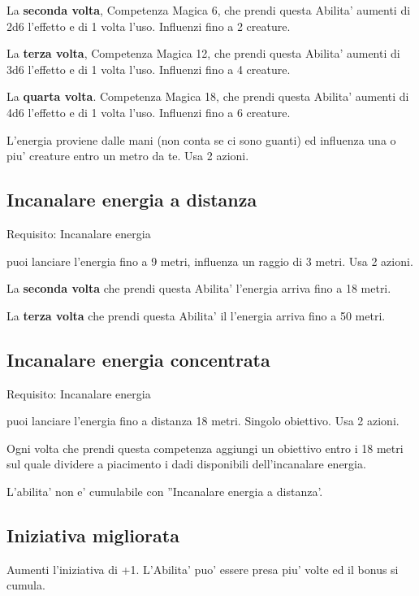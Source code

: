 \documentclass[a4paper,11pt,twoside,openany]{book}
\begin{document}
	La \textbf{seconda volta}, Competenza Magica 6, che prendi questa Abilita' aumenti di 2d6 l'effetto e di 1 volta l'uso. Influenzi fino a 2 creature.
	
	La \textbf{terza volta}, Competenza Magica 12, che prendi questa Abilita' aumenti di 3d6 l'effetto e di 1 volta l'uso. Influenzi fino a 4 creature.
	
	La \textbf{quarta volta}. Competenza Magica 18, che prendi questa Abilita' aumenti di 4d6 l'effetto e di 1 volta l'uso. Influenzi fino a 6 creature.
	
	L'energia proviene dalle mani (non conta se ci sono guanti) ed influenza una o piu' creature entro un metro da te. Usa 2 azioni.
	
	\subsection{Incanalare energia a distanza}
	
	Requisito: Incanalare energia
	
	puoi lanciare l'energia fino a 9 metri, influenza un raggio di 3 metri. Usa 2 azioni.
	
	La \textbf{seconda volta} che prendi questa Abilita' l'energia arriva fino a 18 metri.
	
	La \textbf{terza volta} che prendi questa Abilita' il l'energia arriva fino a 50 metri.
	
	\subsection{Incanalare energia concentrata}
	
	Requisito: Incanalare energia
	
	puoi lanciare l'energia fino a distanza 18 metri. Singolo obiettivo. Usa 2 azioni.
	
	Ogni volta che prendi questa competenza aggiungi un obiettivo entro i 18 metri sul quale dividere a piacimento i dadi disponibili dell'incanalare energia.
	
	L'abilita' non e' cumulabile con ''Incanalare energia a distanza'.
	
	\subsection{Iniziativa migliorata}
	
	Aumenti l'iniziativa di +1. L'Abilita' puo' essere presa piu' volte ed il bonus si cumula.
	
\end{document}
